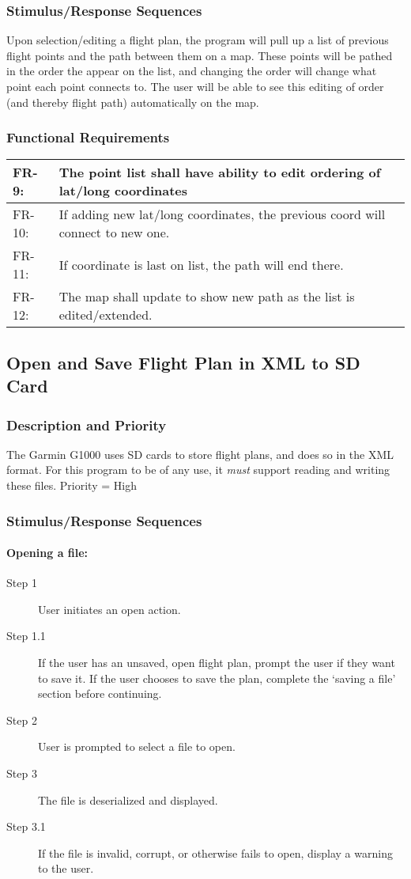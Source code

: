 \documentclass[12pt, letterpaper]{article}
\begin{document}
\subsubsection{Stimulus/Response Sequences}
Upon selection/editing a flight plan, the program will pull up a list of previous flight points and the path between them on a map.
These points will be pathed in the order the appear on the list, and changing the order will change what point each point connects to.
The user will be able to see this editing of order (and thereby flight path) automatically on the map.

\subsubsection{Functional Requirements}
\begin{tabularx}{\textwidth}{|l|X|} \hline
FR-9: & The point list shall have ability to edit ordering of lat/long coordinates\\ \hline
FR-10: & If adding new lat/long coordinates, the previous coord will connect to new one.\\ \hline
FR-11: & If coordinate is last on list, the path will end there.\\ \hline
FR-12: & The map shall update to show new path as the list is edited/extended.\\ \hline
\end{tabularx}

\subsection{Open and Save Flight Plan in XML to SD Card}
\subsubsection{Description and Priority}
The Garmin G1000 uses SD cards to store flight plans, and does so in the XML format.
For this program to be of any use, it \emph{must} support reading and writing these files.
Priority = High

\subsubsection{Stimulus/Response Sequences}
\paragraph{Opening a file:}
\begin{description}
    \item[Step 1] User initiates an open action.
    \item[Step 1.1] If the user has an unsaved, open flight plan, prompt the user if they want to save it.
        If the user chooses to save the plan, complete the `saving a file' section before continuing.
    \item[Step 2] User is prompted to select a file to open.
    \item[Step 3] The file is deserialized and displayed.
    \item[Step 3.1] If the file is invalid, corrupt, or otherwise fails to open, display a warning to the user.
\end{description}
\end{document}
